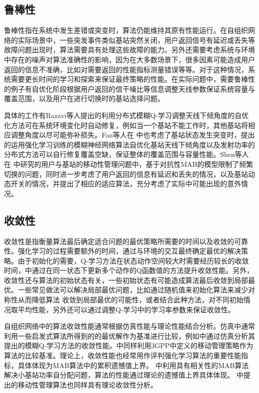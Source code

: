 \documentclass{IEEEtran}
\begin{document}
\subsection{鲁棒性}
鲁棒性指在系统中发生差错或突变时，算法仍能维持其原有性能运行。在自组织网络的实际场景中，一些突发事件类似基站突然关闭，用户返回信号有延迟或丢失等故障问题出现时，算法需要具有处理这些故障的能力。另外还需要考虑系统与环境中存在的噪声对算法准确性的影响，因为在大多数场景下，很多因素可能造成用户返回的信息不准确，比如对需要返回的性能指标测量错误等等。对于这种情况，系统需要更长时间的学习和探索来保证最终策略的性能。在实际问题中，需要鲁棒性的例子有自优化阶段根据用户返回的信干噪比等信息调整天线参数保证系统容量与覆盖范围，以及用户在进行切换时的基站选择问题。

具体的工作有Razavi等人\cite{Razavi2010}提出的利用分布式模糊Q-学习调整天线下倾角度的自优化方法可在系统环境变化时自动修复，例如当一个基站不能工作时，其他基站将相应调整角度以尽可能弥补损失。Fan等人在\cite{Fan2014} 中也考虑了基站状态发生突变时，提出的运用强化学习训练的模糊神经网络算法自优化基站天线下倾角度以及发射功率的分布式方法可以自行修复覆盖空缺，保证整体的覆盖范围与容量性能。Shen等人在\cite{Shen2016} 中研究的用户与基站的移动性管理问题中，基于对抗性MAB的模型限制了频繁切换的问题，同时进一步考虑了用户返回的信息有延迟和丢失的情况，以及基站动态开关的情况，并提出了相应的适应算法，充分考虑了实际中可能出现的意外情况。

\subsection{收敛性}
收敛性是指衡量算法最后确定适合问题的最优策略所需要的时间以及收敛的可靠性。强化学习的过程需要额外的时间，通过与环境的交互最终确定最优的解决策略。由于初始化的需要，Q-学习方法在状态动作空间较大时需要经历较长的收敛时间，\cite{Simsek2011}中通过在同一状态下更新多个动作的Q函数值的方法提升收敛性能。另外，收敛性还与算法的初始状态有关，一些初始状态有可能造成算法最后收敛到局部最优。一些常见做法可以解决局部最优问题，比如通过随机值来初始化算法来减少对称性从而降低算法 收敛到局部最优的可能性，或者结合此种方法，对不同初始情况取平均性能，另外还可以通过调整Q-学习中的学习率参数来保证收敛性。

自组织网络中的算法收敛性能通常根据仿真性能与理论性能结合分析。仿真中通常利用一些启发式算法所得到的的最优解作为基准进行比较，例如\cite{Razavi2010a}中通过仿真分析其提出的模糊Q-学习方法的收敛性能。\cite{Simsek2015a}中同样利用3GPP中定义的移动管理策略作为算法的比较基准。理论上，收敛性能也经常用作评判强化学习算法的重要性能指标，具体体现为MAB算法中的累积遗憾值上界。\cite{Wang2017} 中利用具有相关性的MAB算法解决小基站功率自分配问题，算法的性能通过理论的遗憾值上界具体体现。\cite{Shen2016} 中提出的移动性管理算法也同样具有理论收敛性分析。
\end{document}
